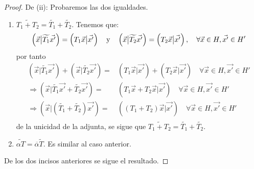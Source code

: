 \documentclass[12pt]{report}
\newcounter{it}
\theoremstyle{largebreak}
\newcommand\adj[1]{\ensuremath{\widetilde{#1}}}
\newcommand\pint[2]{\ensuremath{\left(#1\big|#2\right)}}
\newcommand\conj[1]{\ensuremath{\overline{#1}}}
\begin{document}
\begin{proof}
        De (ii): Probaremos las dos igualdades.
        \begin{enumerate}
            \item $\adj{T_1+T_2}=\adj{T_1}+\adj{T_2}$. Tenemos que:
            \begin{equation*}
                \pint{\vec{x}}{\adj{T_1}\vec{x'}}=\pint{T_1\vec{x}}{\vec{x'}}\quad\textup{y}\quad\pint{\vec{x}}{\adj{T_2}\vec{x'}}=\pint{T_2\vec{x}}{\vec{x'}},\quad\forall\vec{x}\in H,\vec{x'}\in H'
            \end{equation*}
            por tanto
            \begin{equation*}
                \begin{split}
                    \pint{\vec{x}}{\adj{T_1}\vec{x'}}+\pint{\vec{x}}{\adj{T_2}\vec{x'}}=&\pint{T_1\vec{x}}{\vec{x'}}+\pint{T_2\vec{x}}{\vec{x'}}\quad\forall\vec{x}\in H,\vec{x'}\in H'\\
                    \Rightarrow\pint{\vec{x}}{\adj{T_1}\vec{x'}+\adj{T_2}\vec{x'}}=&\pint{T_1\vec{x}+T_2\vec{x}}{\vec{x'}}\quad\forall\vec{x}\in H,\vec{x'}\in H'\\
                    \Rightarrow \pint{\vec{x}}{(\adj{T_1}+\adj{T_2})\vec{x'}}=&\pint{(T_1+T_2)\vec{x}}{\vec{x'}}\quad\forall\vec{x}\in H,\vec{x'}\in H'\\
                \end{split}
            \end{equation*}
            de la unicidad de la adjunta, se sigue que $\adj{T_1+T_2}=\adj{T_1}+\adj{T_2}$.
            \item $\adj{\alpha T}=\conj{\alpha}\adj{T}$. Es similar al caso anterior.
        \end{enumerate}
        De los dos incisos anteriores se sigue el resultado.


\end{proof}
\end{document}
